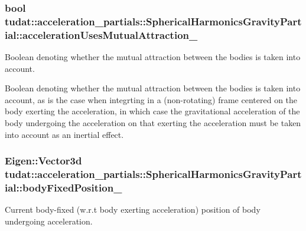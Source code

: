 \subsubsection[{\texorpdfstring{acceleration\+Uses\+Mutual\+Attraction\+\_\+}{accelerationUsesMutualAttraction_}}]{\setlength{\rightskip}{0pt plus 5cm}bool tudat\+::acceleration\+\_\+partials\+::\+Spherical\+Harmonics\+Gravity\+Partial\+::acceleration\+Uses\+Mutual\+Attraction\+\_\+\hspace{0.3cm}{\ttfamily [protected]}}\hypertarget{classtudat_1_1acceleration__partials_1_1SphericalHarmonicsGravityPartial_aadf9b1035115c37289fb59d44eba2778}{}\label{classtudat_1_1acceleration__partials_1_1SphericalHarmonicsGravityPartial_aadf9b1035115c37289fb59d44eba2778}


Boolean denoting whether the mutual attraction between the bodies is taken into account. 

Boolean denoting whether the mutual attraction between the bodies is taken into account, as is the case when integrting in a (non-\/rotating) frame centered on the body exerting the acceleration, in which case the gravitational acceleration of the body undergoing the acceleration on that exerting the acceleration must be taken into account as an inertial effect. 
\subsubsection[{\texorpdfstring{body\+Fixed\+Position\+\_\+}{bodyFixedPosition_}}]{\setlength{\rightskip}{0pt plus 5cm}Eigen\+::\+Vector3d tudat\+::acceleration\+\_\+partials\+::\+Spherical\+Harmonics\+Gravity\+Partial\+::body\+Fixed\+Position\+\_\+\hspace{0.3cm}{\ttfamily [protected]}}\hypertarget{classtudat_1_1acceleration__partials_1_1SphericalHarmonicsGravityPartial_a96f617d424d3108f5fe63163309f987b}{}\label{classtudat_1_1acceleration__partials_1_1SphericalHarmonicsGravityPartial_a96f617d424d3108f5fe63163309f987b}


Current body-\/fixed (w.\+r.\+t body exerting acceleration) position of body undergoing acceleration. 

